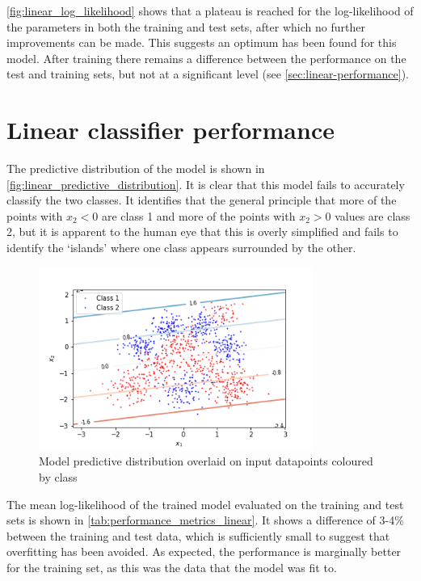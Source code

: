 \documentclass[a4paper]{article}
\begin{document}
    \autoref{fig:linear_log_likelihood} shows that a plateau is reached for the log-likelihood of the parameters in both the
    training and test sets, after which no further improvements can be made. This suggests an optimum has been found for
    this model. After training there remains a difference between the performance on the test and training sets, but not
    at a significant level (see \autoref{sec:linear-performance}).

    \section{Linear classifier performance}\label{sec:linear-performance}
    The predictive distribution of the model is shown in \autoref{fig:linear_predictive_distribution}. It is clear that
    this model fails to accurately classify the two classes. It identifies that the general principle that more of the
    points with $x_2 < 0$ are class 1 and more of the points with $x_2 > 0$ values are class 2, but it is apparent to
    the human eye that this is overly simplified and fails to identify the `islands' where one class appears surrounded
    by the other.

    \begin{figure}[h]
        \label{fig:linear_predictive_distribution}
        \centering
        \includegraphics[width=0.8\textwidth]{plots/predictive_distribution_linear.png}
        \caption{Model predictive distribution overlaid on input datapoints coloured by class}
    \end{figure}

    The mean log-likelihood of the trained model evaluated on the training and test sets is shown in
    \autoref{tab:performance_metrics_linear}. It shows a difference of 3-4\% between the training and test data, which is
    sufficiently small to suggest that overfitting has been avoided. As expected, the performance is marginally better
    for the training set, as this was the data that the model was fit to.
\end{document}
